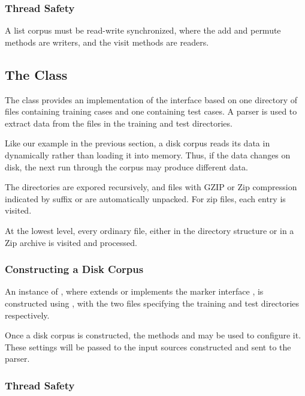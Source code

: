 \subsubsection{Thread Safety}

A list corpus must be read-write synchronized, where the add
and permute methods are writers, and the visit methods are readers.

\subsection{The  Class}

The  class provides an implementation of the
 interface based on one directory of files containing
training cases and one containing test cases.  A parser is used to
extract data from the files in the training and test directories.

Like our example in the previous section, a disk corpus reads its data
in dynamically rather than loading it into memory.  Thus, if the data
changes on disk, the next run through the corpus may produce different
data.  

The directories are expored recursively, and files with GZIP
or Zip compression indicated by suffix  or 
are automatically unpacked.  For zip files, each entry is visited.

At the lowest level, every ordinary file, either in the directory
structure or in a Zip archive is visited and processed. 

\subsubsection{Constructing a Disk Corpus}

An instance of , where  extends or
implements the marker interface , is constructed using
, with the two files
specifying the training and test directories respectively.

Once a disk corpus is constructed, the methods
 and  may be
used to configure it.  These settings will be passed to the input
sources constructed and sent to the parser.

\subsubsection{Thread Safety}

